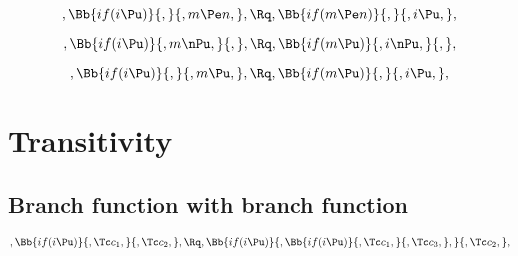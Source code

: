 \bigskip
\bigskip
\[, \Bb{if(i \Pu)}{,}{,m \Pe n,}, \Rq , \Bb{if(m \Pe n)}{,}{,i \Pu,},\]

\bigskip
\bigskip
\[, \Bb{if(i \Pu)}{,m \nPu,}{,}, \Rq , \Bb{if(m \Pu)}{,i \nPu,}{,},\]

\bigskip
\bigskip
\[, \Bb{if(i \Pu)}{,}{,m \Pu,}, \Rq , \Bb{if(m \Pu)}{,}{,i \Pu,},\]




\bigskip
\bigskip
\bigskip
\bigskip
\section{Transitivity}
\subsection{Branch function with branch function}
\[, \Bb{if(i \Pu)}{,\Tc c_1,}{,\Tc c_2,}, \Rq , \Bb{if(i \Pu)}{,\Bb{if(i \Pu)}{,\Tc c_1,}{,\Tc c_3,},}{,\Tc c_2,},\]

